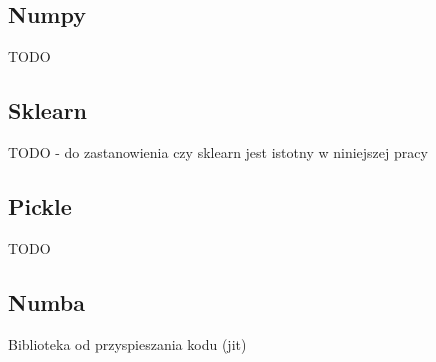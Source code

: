 \subsection{Numpy}
TODO

\subsection{Sklearn}
TODO - do zastanowienia czy sklearn jest istotny w niniejszej pracy

\subsection{Pickle}
TODO

\subsection{Numba}
Biblioteka od przyspieszania kodu (jit)